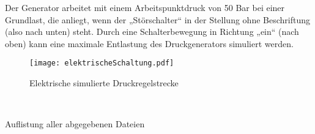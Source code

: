 \documentclass[11pt, a4paper,parskip=half]{article}
\begin{document}
Der Generator arbeitet mit einem Arbeitspunktdruck von 50 Bar bei einer Grundlast, die anliegt, wenn der „Störschalter“ in der Stellung ohne Beschriftung (also nach unten) steht. Durch eine Schalterbewegung in Richtung „ein“ (nach oben) kann eine maximale Entlastung des Druckgenerators simuliert werden.


\begin{figure}[htbp]
	\begin{center}
		\texttt{[image: elektrischeSchaltung.pdf]} 
		\caption{Elektrische simulierte Druckregelstrecke}
     \label{RegelObj}
	\end{center} 
\end{figure}


\newpage
[Hansert]\\
\begin{huge}
Auflistung aller abgegebenen Dateien\\

\end{huge}
\end{document}
